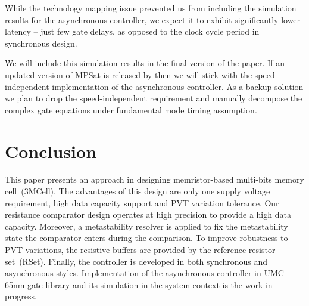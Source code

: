 \documentclass[twocolumn,conference]{IEEEtran}
\begin{document}
While the technology mapping issue prevented us from including the simulation results for the asynchronous controller, we expect it to exhibit significantly lower latency -- just few gate delays, as opposed to the clock cycle period in synchronous design.

We will include this simulation results in the final version of the paper. If an updated version of MPSat is released by then we will stick with the speed-independent implementation of the asynchronous controller. As a backup solution we plan to drop the speed-independent requirement  and manually decompose the complex gate equations under fundamental mode timing assumption.



\section{Conclusion}
\label{sec:Conclusion}

This paper presents an approach in designing memristor-based multi-bits memory cell~(3MCell). The advantages of this design are only one supply voltage requirement, high data capacity support and PVT variation tolerance. Our resistance comparator design operates at high precision to provide a high data capacity. Moreover, a metastability resolver is applied to fix the metastability state the comparator enters during the comparison. To improve robustness to PVT variations, the resistive buffers are provided by the reference resistor set~(RSet). Finally, the controller is developed in both synchronous and asynchronous styles. Implementation of the asynchronous controller in UMC 65nm gate library and its simulation in the system context is the work in progress.



\end{document}
